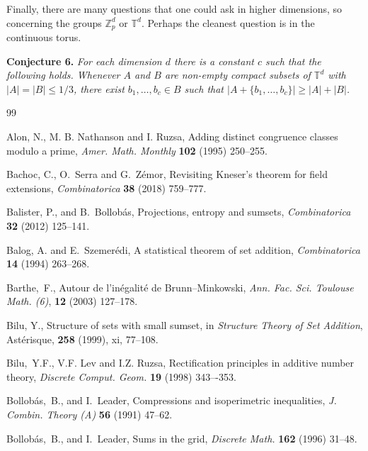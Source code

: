 \documentclass[12pt,reqno]{amsart}
\theoremstyle{definition}
\renewcommand\leq{\leqslant}
\renewcommand\geq{\geqslant}
\begin{document}
\vspace{5pt}
Finally, there are many questions that one could ask in higher dimensions, so concerning the groups ${\mathbb Z}_p^d$
or ${\mathbb T}^d$. Perhaps the cleanest question is in the continuous torus.

\vspace{5pt}
{\bf Conjecture 6. }{\em
For each dimension $d$ there is a constant $c$ such that the following holds. Whenever
$A$ and $B$ are non-empty compact subsets of $\mathbb{T}^d$ with $|A|=|B| \leq 1/3$, there
exist $b_1, \hdots, b_c \in B$ such that $|A+\{b_1, \hdots, b_c\} |\geq |A|+|B|$.
}

\vspace{5pt}

\begin{thebibliography}{99}


Alon, N., M. B. Nathanson and I. Ruzsa,
Adding distinct congruence classes modulo a prime,
{\em Amer. Math. Monthly} {\bf 102} (1995)  250--255.

Bachoc, C., O.~Serra and G.~Z\'emor,  Revisiting Kneser's theorem for field extensions, {\em Combinatorica} {\bf 38} (2018)  759--777.


Balister, P., and B.~Bollob\'as,  Projections, entropy and sumsets, {\em Combinatorica} {\bf 32} (2012) 125--141.

Balog, A. and E.~Szemer\'edi,
A statistical theorem of set addition,
{\em Combinatorica} {\bf 14} (1994) 263--268.

Barthe,~F.,
Autour de l'in\'egalit\'e de Brunn--Minkowski,
{\em Ann. Fac. Sci. Toulouse Math. (6)}, {\bf 12} (2003) 127--178.

Bilu, Y., Structure of sets with small sumset, in {\em Structure Theory of Set Addition}, Ast\'erisque, {\bf 258} (1999), xi, 77--108.

Bilu,~Y.F., V.F. Lev and I.Z. Ruzsa, Rectification principles in additive number theory,
{\em Discrete Comput. Geom.} {\bf 19} (1998) 343–-353.

Bollob\'as,~B., and I.~Leader,
Compressions and isoperimetric inequalities,
{\em J. Combin. Theory (A)} {\bf 56} (1991) 47--62.

Bollob\'as,~B., and I.~Leader,
Sums in the grid, {\em Discrete Math.} {\bf 162} (1996) 31--48.




\end{thebibliography}
\end{document}
